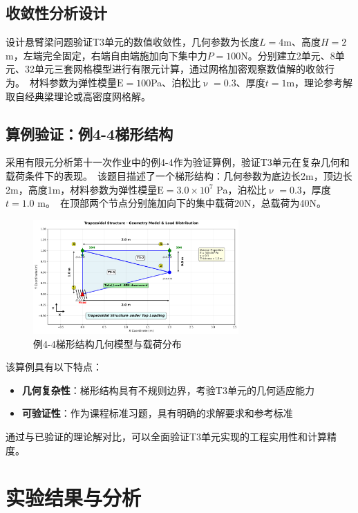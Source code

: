 \documentclass[12pt,a4paper]{article}
\newcommand{\E}{\mathrm{E}}           %
\newcommand{\pnu}{\upnu}             %
\begin{document}
\subsection{收敛性分析设计}

设计悬臂梁问题验证T3单元的数值收敛性，几何参数为长度$L = 4$m、高度$H = 2$m，左端完全固定，右端自由端施加向下集中力$P = 100$N。分别建立2单元、8单元、32单元三套网格模型进行有限元计算，通过网格加密观察数值解的收敛行为。\
材料参数为弹性模量$\E = 100$Pa、泊松比$\pnu = 0.3$、厚度$t = 1$m，理论参考解取自经典梁理论或高密度网格解。

\subsection{算例验证：例4-4梯形结构}

采用有限元分析第十一次作业中的例4-4作为验证算例，验证T3单元在复杂几何和载荷条件下的表现。\
该题目描述了一个梯形结构：几何参数为底边长2m，顶边长2m，高度1m，材料参数为弹性模量$\E = 3.0 \times 10^7$ Pa，泊松比$\pnu = 0.3$，厚度$t = 1.0$ m。\
在顶部两个节点分别施加向下的集中载荷20N，总载荷为40N。

\begin{figure}[H]
\centering
\includegraphics[width=0.7\textwidth]{img/wzy_geometry_model.png}
\caption{例4-4梯形结构几何模型与载荷分布}
\label{fig:wzy_model}
\end{figure}

该算例具有以下特点：
\begin{itemize}
    \item \textbf{几何复杂性}：梯形结构具有不规则边界，考验T3单元的几何适应能力
    \item \textbf{可验证性}：作为课程标准习题，具有明确的求解要求和参考标准
\end{itemize}

通过与已验证的理论解对比，可以全面验证T3单元实现的工程实用性和计算精度。

\section{实验结果与分析}
\end{document}
